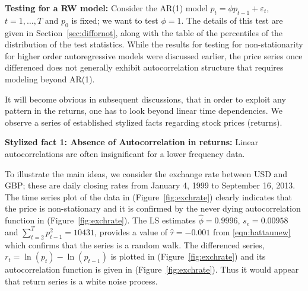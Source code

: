 \noindent\textbf{Testing for a RW model:} Consider the AR(1) model $p_t = \phi p_{t-1} + \varepsilon_t$, $t = 1,\ldots,T$ and $p_0$ is fixed; we want to test $\phi = 1$. The details of this test are given in Section~\ref{sec:diffornot}, along with the table of the percentiles of the distribution of the test statistics. While the results for testing for non-stationarity for higher order autoregressive models were discussed earlier, the price series once differenced does not generally exhibit autocorrelation structure that requires modeling beyond AR(1).


It will become obvious in subsequent discussions, that in order to exploit any pattern in the returns, one has to look beyond linear time dependencies. We observe a series of established stylized facts regarding stock prices (returns). \twomedskip


\noindent\textbf{Stylized fact 1: Absence of Autocorrelation in returns:} Linear autocorrelations are often insignificant for a lower frequency data. 


To illustrate the main ideas, we consider the exchange rate between USD and GBP; these are daily closing rates from January 4, 1999 to September 16, 2013. The time series plot of the data in (Figure~\ref{fig:exchrate}) clearly indicates that the price is non-stationary and it is confirmed by the never dying autocorrelation function in (Figure~\ref{fig:exchrate}). The LS estimates $\hat{\phi}= 0.9996$, $s_e= 0.00958$ and $\sum_{t=2}^T p_{t-1}^2 = 10431$, provides a value of $\hat{\tau} = -0.001$ from \eqref{eqn:hattaunew} which confirms that the series is a random walk. The differenced series, $r_t = \ln{(p_t)} - \ln{(p_{t-1})}$ is plotted in (Figure~\ref{fig:exchrate}) and its autocorrelation function is given in (Figure~\ref{fig:exchrate}). Thus it would appear that return series is a white noise process.


